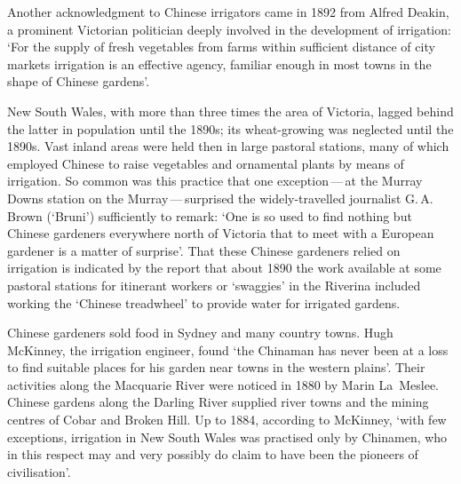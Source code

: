 Another acknowledgment to Chinese irrigators came in 1892 from Alfred
Deakin,  a prominent Victorian politician deeply
involved in the development of irrigation: `For the supply of fresh
vegetables from farms within sufficient distance of city markets
irrigation is an effective agency, familiar enough in most towns in
the shape of Chinese gardens'.

New South Wales,  with more than three times
the area of Victoria, lagged behind the latter in population until the
1890s; its wheat-growing was neglected until the 1890s.  Vast inland
areas were held then in large pastoral stations, many of which
employed Chinese  to raise vegetables and ornamental
plants by means of irrigation.  So common was this practice that one
exception\,---\,at the Murray Downs station  on the Murray\,---\,surprised
 the
widely-travelled journalist G.\,A. Brown (`Bruni')  sufficiently to remark: `One is so used to find nothing but
Chinese gardeners everywhere north of Victoria that to meet with a
European gardener is a matter of surprise'.  That these Chinese
gardeners relied on irrigation is indicated by the report that about
1890 the work available at some pastoral stations for itinerant
workers or `swaggies' in the Riverina  included
working the `Chinese treadwheel' to provide water for irrigated
gardens.

Chinese gardeners sold food in Sydney  and many
country towns. Hugh McKinney,  the irrigation
engineer, found `the Chinaman has nev\-er been at a loss to find
suitable places for his garden near towns in the western plains'.
Their activities along the Macquarie River 
were noticed in 1880 by Marin La~Meslee.  
Chinese gardens along the Darling River  supplied
river towns and the mining centres of Cobar  and
Broken Hill.  Up to 1884, according to
McKinney, `with few exceptions, irrigation in New South Wales was
practised only by Chinamen, who in this respect may and very possibly
do claim to have been the pioneers of civilisation'.

